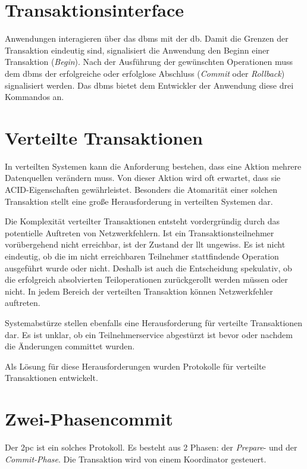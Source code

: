 \section{Transaktionsinterface}
Anwendungen interagieren über das \acrshort{dbms} mit der \acrshort{db}. Damit die Grenzen der Transaktion eindeutig sind, signalisiert die Anwendung den Beginn einer Transaktion (\textit{Begin}). Nach der Ausführung der gewünschten Operationen muss dem \acrshort{dbms} der erfolgreiche oder erfolglose Abschluss (\textit{Commit} oder \textit{Rollback}) signalisiert werden\cite{Dey.}. Das \acrshort{dbms} bietet dem Entwickler der Anwendung diese drei Kommandos an.

\section{Verteilte Transaktionen}
In verteilten Systemen kann die Anforderung bestehen, dass eine Aktion mehrere Datenquellen verändern muss. Von dieser Aktion wird oft erwartet, dass sie ACID-Eigenschaften gewährleistet. Besonders die Atomarität einer solchen Transaktion stellt eine große Herausforderung in verteilten Systemen dar. 

Die Komplexität verteilter Transaktionen entsteht vordergründig durch das potentielle Auftreten von Netzwerkfehlern. Ist ein Transaktionsteilnehmer vorübergehend nicht erreichbar, ist der Zustand der \acrshort{llt} ungewiss. Es ist nicht eindeutig, ob die im nicht erreichbaren Teilnehmer stattfindende Operation ausgeführt wurde oder nicht. Deshalb ist auch die Entscheidung spekulativ, ob die erfolgreich absolvierten Teiloperationen zurückgerollt werden müssen oder nicht. In jedem Bereich der verteilten Transaktion können Netzwerkfehler auftreten. 

Systemabstürze stellen ebenfalls eine Herausforderung für verteilte Transaktionen dar. Es ist unklar, ob ein Teilnehmerservice abgestürzt ist bevor oder nachdem die Änderungen committet wurden. 

Als Lösung für diese Herausforderungen wurden Protokolle für verteilte Transaktionen entwickelt. 

\section{Zwei-Phasencommit}
Der \acrfull{2pc} ist ein solches Protokoll. Es besteht aus 2 Phasen: der \textit{Prepare}- und der \textit{Commit-Phase}. Die Transaktion wird von einem Koordinator gesteuert. 

